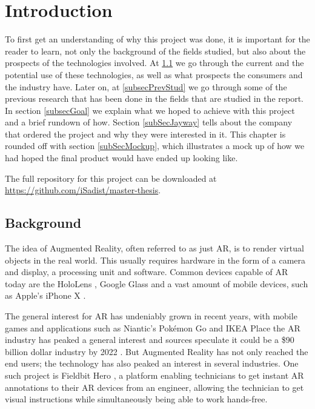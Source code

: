 \chapter{Introduction}
To first get an understanding of why this project was done, it is important for the reader to learn, not only the background of the fields studied, but also about the prospects of the technologies involved.
 At \ref{subsecBackground} we go through the current and the potential use of these technologies, as well as what prospects the consumers and the industry have. Later on, at  \ref{subsecPrevStud} we go through some of the previous research that has been done in the fields that are studied in the report. In section \ref{subsecGoal} we explain what we hoped to achieve with this project and a brief rundown of how. Section \ref{subSecJayway} tells about the company that ordered the project and why they were interested in it. This chapter is rounded off with section \ref{subSecMockup}, which illustrates a mock up of how we had hoped the final product would have ended up looking like.
 
 The full repository for this project can be downloaded at \url{https://github.com/iSadist/master-thesis}.

\section{Background}
\label{subsecBackground}
The idea of Augmented Reality,  often referred to as just AR, is to render virtual objects in the real world. This usually 
requires hardware in the form of a camera and display, a processing unit and software. 
Common devices capable of AR today are the HoloLens \cite{microsoft}, Google Glass 
\cite{googleGlasses} and a vast amount of mobile devices, such as Apple's iPhone X 
\cite{appleAR}. 

The general interest for AR has undeniably grown in recent years, with mobile games and 
applications such as Niantic's Pokémon Go \cite{pokemonGO} and IKEA Place 
\cite{IKEAPlace} the AR industry has peaked a general interest and sources speculate it 
could be a \$90 billion dollar industry by 2022 \cite{digi-capital}.
But Augmented Reality has not only reached the end users; the technology has also 
peaked an interest in several industries. One such project is Fieldbit Hero 
\cite{fieldbit}, a platform enabling technicians to get instant AR annotations to their AR 
devices from an engineer, allowing the technician to get visual instructions while 
simultaneously  being able to work hands-free. 
 
